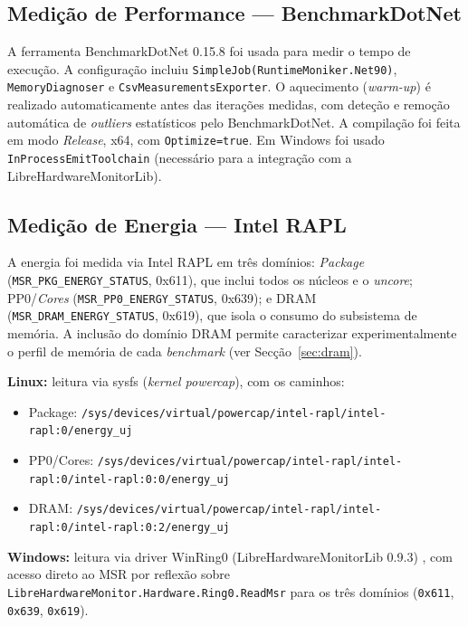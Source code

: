 \documentclass[12pt,a4paper]{article}
\begin{document}
\subsection{Medição de Performance --- BenchmarkDotNet}

A ferramenta BenchmarkDotNet 0.15.8 \cite{BenchmarkDotNet} foi usada para medir
o tempo de execução.
A configuração incluiu \texttt{SimpleJob(RuntimeMoniker.Net90)},
\texttt{MemoryDiagnoser} e \texttt{CsvMeasurementsExporter}.
O aquecimento (\textit{warm-up}) é realizado automaticamente antes das iterações
medidas, com deteção e remoção automática de \textit{outliers} estatísticos pelo
BenchmarkDotNet.
A compilação foi feita em modo \textit{Release}, x64, com
\texttt{Optimize=true}.
Em Windows foi usado \texttt{InProcessEmitToolchain} (necessário para a
integração com a LibreHardwareMonitorLib).

\subsection{Medição de Energia --- Intel RAPL}
\label{sec:rapl}

A energia foi medida via Intel RAPL \cite{IntelRAPL} em três domínios:
\textit{Package} (\texttt{MSR\_PKG\_ENERGY\_STATUS}, 0x611), que inclui todos
os núcleos e o \textit{uncore}; PP0/\textit{Cores}
(\texttt{MSR\_PP0\_ENERGY\_STATUS}, 0x639); e DRAM
(\texttt{MSR\_DRAM\_ENERGY\_STATUS}, 0x619), que isola o consumo do
subsistema de memória.
A inclusão do domínio DRAM permite caracterizar experimentalmente o perfil de
memória de cada \textit{benchmark} (ver Secção~\ref{sec:dram}).

\textbf{Linux:} leitura via sysfs (\textit{kernel powercap}), com os caminhos:
\begin{itemize}
  \item Package:
    \texttt{/sys/devices/virtual/powercap/intel-rapl/intel-rapl:0/energy\_uj}
  \item PP0/Cores:
    \texttt{/sys/devices/virtual/powercap/intel-rapl/intel-rapl:0/intel-rapl:0:0/energy\_uj}
  \item DRAM:
    \texttt{/sys/devices/virtual/powercap/intel-rapl/intel-rapl:0/intel-rapl:0:2/energy\_uj}
\end{itemize}

\textbf{Windows:} leitura via driver WinRing0 (LibreHardwareMonitorLib 0.9.3)
\cite{LibreHardwareMonitor}, com acesso direto ao MSR por reflexão sobre
\texttt{LibreHardwareMonitor.Hardware.Ring0.ReadMsr} para os três domínios
(\texttt{0x611}, \texttt{0x639}, \texttt{0x619}).
\end{document}
